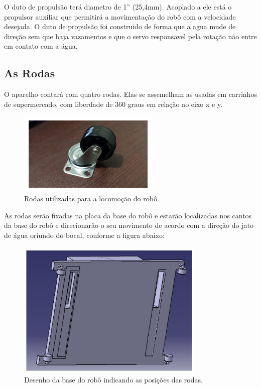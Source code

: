 O duto de propulsão terá diametro de 1” (25,4mm). Acoplado a ele está o propulsor auxiliar que permitirá a movimentação do robô com a velocidade desejada. O duto de propulsão foi construido de forma que a agua mude de direção sem que haja vazamentos e que o servo responsavel pela rotação não entre em contato com a água.

\subsection{As Rodas}
O aparelho contará com quatro rodas. Elas se assemelham as usadas em carrinhos de supermercado, com liberdade de 360 graus em relação ao eixo x e y.
\par
  \begin{figure}[h]
    \centering
    \includegraphics[width=0.6\textwidth]{figures/wheel-market.png}
    \caption{Rodas utilizadas para a locomoção do robô.}
    \label{fig:wheel-market}
  \end{figure}
  \FloatBarrier
\par
As rodas serão fixadas na placa da base do robô e estarão localizadas nos cantos da base do robô e direcionarão o seu movimento de acordo com a direção do jato de água oriundo do bocal, conforme a figura abaixo:
\par
  \begin{figure}[h]
    \centering
    \includegraphics[width=0.8\textwidth]{figures/catia-base.png}
    \caption{Desenho da base do robô indicando as posições das rodas.}
    \label{fig:catia-base}
  \end{figure}
  \FloatBarrier
\par


